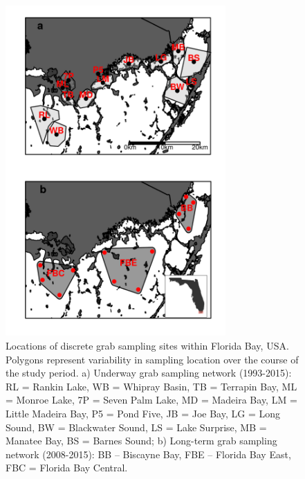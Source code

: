 %




%
%

\newpage

\begin{figure}
  \centering
  \includegraphics[width=0.75\textwidth]{../../figures/fbmap.png}
  \caption{Locations of discrete grab sampling sites within Florida Bay, USA. Polygons represent variability in sampling location over the course of the study period. a) Underway grab sampling network (1993-2015): RL = Rankin Lake, WB = Whipray Basin, TB = Terrapin Bay, ML = Monroe Lake, 7P = Seven Palm Lake, MD = Madeira Bay, LM = Little Madeira Bay, P5 = Pond Five, JB = Joe Bay, LG = Long Sound, BW = Blackwater Sound, LS = Lake Surprise, MB = Manatee Bay, BS = Barnes Sound; b) Long-term grab sampling network (2008-2015): BB – Biscayne Bay, FBE – Florida Bay East, FBC = Florida Bay Central.}
  \label{fig:1}
\end{figure}

